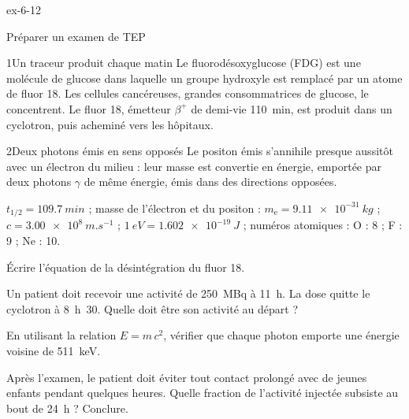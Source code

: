 \begin{blocLivre}{ex-6-12}
\begin{exercice}[3]{Préparer un examen de TEP}
\begin{docu}{1}{Un traceur produit chaque matin}
Le fluorodésoxyglucose (FDG) est une molécule de glucose dans laquelle un groupe hydroxyle est remplacé par un atome
de fluor 18. Les cellules cancéreuses, grandes consommatrices de glucose, le concentrent. Le fluor 18, émetteur
$\beta^+$ de demi-vie 110~min, est produit dans un cyclotron, puis acheminé vers les hôpitaux.
\end{docu}
\begin{docu}{2}{Deux photons émis en sens opposés}
Le positon émis s'annihile presque aussitôt avec un électron du milieu : leur masse est convertie en énergie,
emportée par deux photons $\gamma$ de même énergie, émis dans des directions opposées.
\end{docu}
\begin{donnees}
$t_{1/2}=\qty{109,7}{min}$ ; masse de l'électron et du positon : $m_\mathrm{e}=\qty{9,11e-31}{kg}$ ;
$c=\qty{3,00e8}{m.s^{-1}}$ ; $\qty{1}{eV}=\qty{1,602e-19}{J}$ ; numéros atomiques : O : 8 ; F : 9 ; Ne : 10.
\end{donnees}
\begin{questions}
\item Écrire l'équation de la désintégration du fluor 18.
\item Un patient doit recevoir une activité de 250~MBq à 11~h. La dose quitte le cyclotron à 8~h~30. Quelle doit être
son activité au départ ?
\item En utilisant la relation $E=m\,c^2$, vérifier que chaque photon emporte une énergie voisine de 511~keV.
\item \initiative Après l'examen, le patient doit éviter tout contact prolongé avec de jeunes enfants pendant
quelques heures. Quelle fraction de l'activité injectée subsiste au bout de 24~h ? Conclure.
\end{questions}
\end{exercice}
\end{blocLivre}
